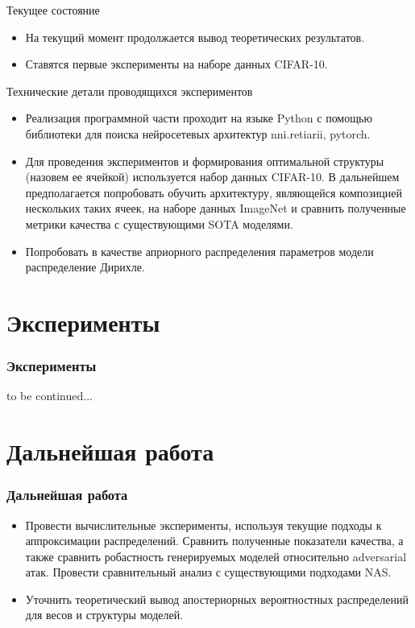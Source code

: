 \documentclass[9pt]{beamer}
\begin{document}
	\begin{frame}{Текущее состояние}
		\begin{itemize}
			\item На текущий момент продолжается вывод теоретических результатов.
			\item Ставятся первые эксперименты на наборе данных CIFAR-10.
		\end{itemize}
	\end{frame}
	
	\begin{frame}{Технические детали проводящихся экспериментов}
		\begin{itemize}
			\item Реализация программной части проходит на языке Python с помощью библиотеки для поиска нейросетевых архитектур nni.retiarii, pytorch.
			\item Для проведения экспериментов и формирования оптимальной структуры (назовем ее ячейкой) используется набор данных CIFAR-10. В дальнейшем предполагается попробовать обучить архитектуру, являющейся композицией нескольких таких ячеек, на наборе данных ImageNet и сравнить полученные метрики качества с существующими SOTA моделями.
			\item Попробовать в качестве априорного распределения параметров модели распределение Дирихле.
			
		\end{itemize}
	\end{frame}
	
	\section{Эксперименты}
	
	\begin{frame}
		\frametitle{Эксперименты}
		
		to be continued...
		
	\end{frame}
	
	
	\section{Дальнейшая работа}
	\begin{frame}
		\frametitle{Дальнейшая работа}
		\begin{itemize}
			\item Провести вычислительные эксперименты, используя текущие подходы к аппроксимации распределений. Сравнить полученные показатели качества, а также сравнить робастность генерируемых моделей относительно adversarial атак. Провести сравнительный анализ с существующими подходами NAS.
			\item Уточнить теоретический вывод апостериорных вероятностных распределений для весов и структуры моделей.
		\end{itemize}
		
	\end{frame}
	
\end{document}
